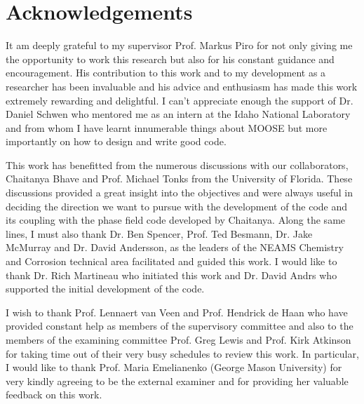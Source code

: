 \chapter*{Acknowledgements}
\label{acknowledgements}

It am deeply grateful to my supervisor Prof. Markus Piro for not only giving me the opportunity to work this research but also for his constant guidance and encouragement. His contribution to this work and to my development as a researcher has been invaluable and his advice and enthusiasm has made this work extremely rewarding and delightful. I can't appreciate enough the support of Dr. Daniel Schwen who mentored me as an intern at the Idaho National Laboratory and from whom I have learnt innumerable things about MOOSE but more importantly on how to design and write good code.

This work has benefitted from the numerous discussions with our collaborators, Chaitanya Bhave and Prof. Michael Tonks from the University of Florida. These discussions provided a great insight into the objectives and were always useful in deciding the direction we want to pursue with the development of the code and its coupling with the phase field code developed by Chaitanya. Along the same lines, I must also thank Dr. Ben Spencer, Prof. Ted Besmann, Dr. Jake McMurray and Dr. David Andersson, as the leaders of the NEAMS Chemistry and Corrosion technical area facilitated and guided this work. I would like to thank Dr. Rich Martineau who initiated this work and Dr. David Andrs who supported the initial development of the code.

I wish to thank Prof. Lennaert van Veen and Prof. Hendrick de Haan who have provided constant help as members of the supervisory committee and also to the members of the examining committee Prof. Greg Lewis and Prof. Kirk Atkinson for taking time out of their very busy schedules to review this work. In particular, I would like to thank Prof. Maria Emelianenko (George Mason University) for very kindly agreeing to be the external examiner and for providing her valuable feedback on this work.

